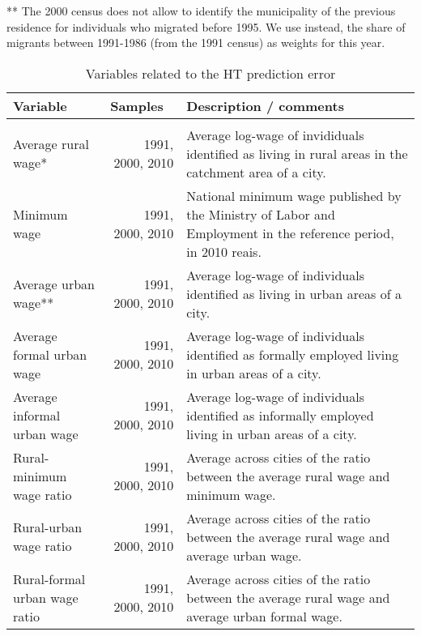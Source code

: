 \begin{sidewaystable}[htbp]
\begin{tablenotes}
			** The 2000 census does not allow to identify the municipality of the previous residence for individuals who migrated before 1995. We use instead, the share of migrants between 1991-1986 (from the 1991 census) as weights for this year.

			\end{tablenotes}
\end{sidewaystable}%

\begin{sidewaystable}[htbp]

  \caption{Variables related to the HT prediction error}
    \begin{tabular}{p{14.445em}rp{37.89em}}
    \multicolumn{1}{l}{\textbf{Variable}} & \multicolumn{1}{l}{\textbf{Samples}} & \multicolumn{1}{l}{\textbf{Description / comments}} \\
    \midrule
    \multicolumn{1}{r}{} &       & \multicolumn{1}{r}{} \\
    Average rural wage* & \multicolumn{1}{p{7.055em}}{1991, 2000, 2010} & Average log-wage of invididuals identified as living in rural areas in the catchment area of a city.  \\
    Minimum wage & \multicolumn{1}{p{7.055em}}{1991, 2000, 2010} & National minimum wage published by the Ministry of Labor and Employment in the reference period, in 2010 reais. \\
    Average urban wage** & \multicolumn{1}{p{7.055em}}{1991, 2000, 2010} & Average log-wage of individuals identified as living in urban areas of a city.  \\
    Average formal urban wage & \multicolumn{1}{p{7.055em}}{1991, 2000, 2010} & Average log-wage of individuals identified as formally employed living in urban areas of a city.  \\
    Average informal urban wage & \multicolumn{1}{p{7.055em}}{1991, 2000, 2010} & Average log-wage of individuals identified as informally employed living in urban areas of a city.  \\
    Rural-minimum wage ratio & \multicolumn{1}{p{7.055em}}{1991, 2000, 2010} & Average across cities of the ratio between the average rural wage and minimum wage. \\
    Rural-urban wage ratio & \multicolumn{1}{p{7.055em}}{1991, 2000, 2010} & Average across cities of the ratio between the average rural wage and average urban wage. \\
    Rural-formal urban wage ratio & \multicolumn{1}{p{7.055em}}{1991, 2000, 2010} & Average across cities of the ratio between the average rural wage and average urban formal wage. \\

\end{tabular}
\end{sidewaystable}
